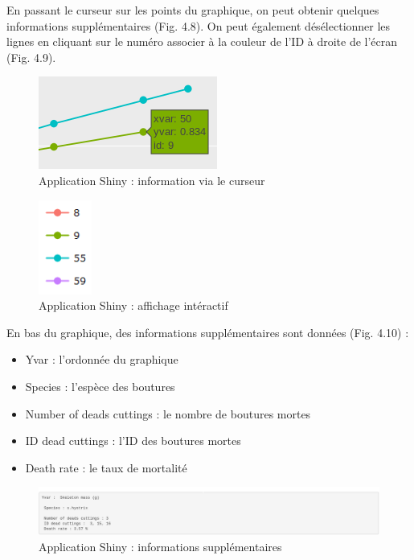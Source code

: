 \documentclass[]{report}
\providecommand{\tightlist}{%
  \setlength{\itemsep}{0pt}\setlength{\parskip}{0pt}}
\begin{document}
En passant le curseur sur les points du graphique, on peut obtenir
quelques informations supplémentaires (Fig. 4.8). On peut également
désélectionner les lignes en cliquant sur le numéro associer à la
couleur de l'ID à droite de l'écran (Fig. 4.9).

\begin{figure}[h!]
\includegraphics[]{../image/info-curseur.PNG}
\caption{Application Shiny : information via le curseur}
\end{figure}

\begin{figure}[h!]
\includegraphics[]{../image/shiny-selection.PNG}
\caption{Application Shiny : affichage intéractif}
\end{figure}

En bas du graphique, des informations supplémentaires sont données (Fig.
4.10) :

\begin{itemize}
\tightlist
\item
  Yvar : l'ordonnée du graphique
\item
  Species : l'espèce des boutures
\item
  Number of deads cuttings : le nombre de boutures mortes
\item
  ID dead cuttings : l'ID des boutures mortes
\item
  Death rate : le taux de mortalité
\end{itemize}

\begin{figure}[h!]
\includegraphics[]{../image/verbatim.PNG}
\caption{Application Shiny : informations supplémentaires}
\end{figure}
\end{document}
